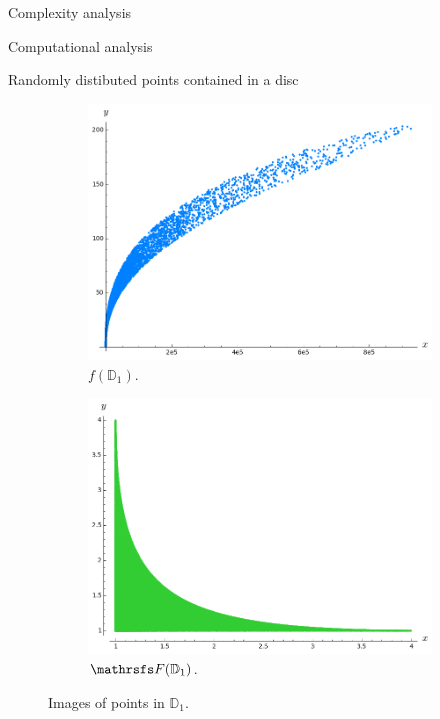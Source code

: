 \documentclass[11pt, a4paper, english, twoside, notitlepage, openright]{report}
\begin{document}
\begin{chapter}{Complexity analysis}
\begin{section}{Computational analysis}
\begin{subsection}{Randomly distibuted points contained in a disc}
\begin{figure}[ht!]
\hspace{0.1cm}
\begin{subfigure}{.49\linewidth}\centering
\includegraphics[width=1\textwidth]{plots/ch5_37_disc2.png}
\vspace{-0.4cm}\caption{$f({\mathbb D}_1)$.\label{fig:disc2}}
\end{subfigure}
\begin{subfigure}{.49\linewidth}\centering
\includegraphics[width=1\textwidth]{plots/ch5_39_disc3.png}
\vspace{-0.4cm}\caption{$\FFF({\mathbb D}_1)$.\label{fig:disc3}}
\end{subfigure}
\vspace{-0.1cm}\caption{Images of points in ${\mathbb D}_{1}$.\label{fig:discAll}}
\end{figure}


\end{subsection}
\end{section}
\end{chapter}
\end{document}
